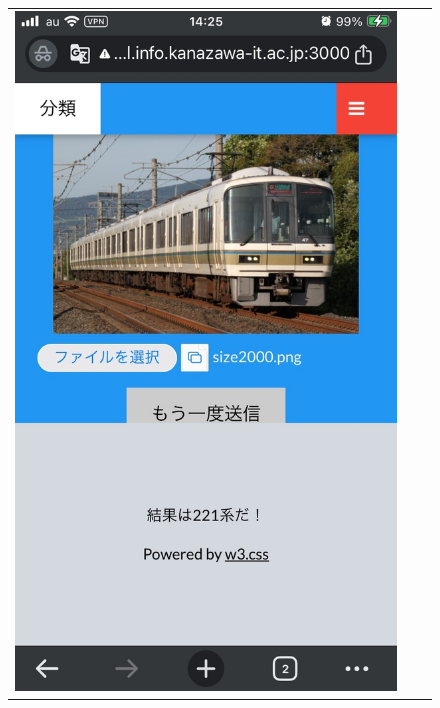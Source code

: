 
\begin{figure}[H]
	\begin{tabular}{ccc}
		\begin{minipage}[b]{0.3\textwidth}
			\centering
			\includegraphics[width=\linewidth]{chap2/fig/img_classify.jpg}

\end{minipage}
\end{tabular}
\end{figure}
